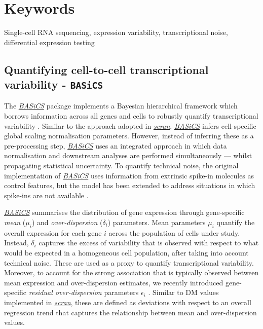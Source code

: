 \documentclass[9pt,a4paper,]{extarticle}
\begin{document}
\section*{Keywords}
Single-cell RNA sequencing, expression variability, transcriptional noise, differential expression testing


\clearpage
\pagestyle{main}

\hypertarget{quantifying-cell-to-cell-transcriptional-variability---basics}{%
\subsection{\texorpdfstring{Quantifying cell-to-cell transcriptional variability - \texttt{BASiCS}}{Quantifying cell-to-cell transcriptional variability - BASiCS}}\label{quantifying-cell-to-cell-transcriptional-variability---basics}}

The \emph{\href{https://bioconductor.org/packages/3.11/BASiCS}{BASiCS}} package implements a Bayesian hierarchical framework
which borrows information across all genes and cells to robustly quantify
transcriptional variability \citep{Vallejos2015BASiCS}.
Similar to the approach adopted in \emph{\href{https://bioconductor.org/packages/3.11/scran}{scran}}, \emph{\href{https://bioconductor.org/packages/3.11/BASiCS}{BASiCS}}
infers cell-specific global scaling normalisation parameters.
However, instead of inferring these as a pre-processing step,
\emph{\href{https://bioconductor.org/packages/3.11/BASiCS}{BASiCS}} uses an integrated approach in which data normalisation
and downstream analyses are performed simultaneously --- whilst propagating
statistical uncertainty.
To quantify technical noise, the original implementation of
\emph{\href{https://bioconductor.org/packages/3.11/BASiCS}{BASiCS}} uses information from extrinsic spike-in molecules as
control features, but the model has been extended to address situations in which
spike-ins are not available \citep{Eling2018}.

\emph{\href{https://bioconductor.org/packages/3.11/BASiCS}{BASiCS}} summarises the distribution of gene expression through
gene-specific \emph{mean} (\(\mu_i\)) and \emph{over-dispersion} (\(\delta_i\)) parameters.
Mean parameters \(\mu_i\) quantify the overall expression for each gene \(i\)
across the population of cells under study.
Instead, \(\delta_i\) captures the excess of variability that is observed with
respect to what would be expected in a homogeneous cell population, after taking
into account technical noise.
These are used as a proxy to quantify transcriptional variability.
Moreover, to account for the strong association that is typically observed
between mean expression and over-dispersion estimates, we recently introduced
gene-specific \emph{residual over-dispersion} parameters \(\epsilon_i\) \citep{Eling2018}.
Similar to DM values implemented in \emph{\href{https://bioconductor.org/packages/3.11/scran}{scran}}, these are defined as
deviations with respect to an overall regression trend that captures the
relationship between mean and over-dispersion values.
\end{document}
